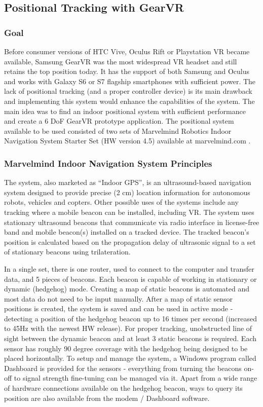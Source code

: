 \documentclass[12pt, a4paper]{article}
\begin{document}
\subsection{Positional Tracking with GearVR}
\subsubsection{Goal}
Before consumer versions of HTC Vive, Oculus Rift or Playstation VR became available, Samsung GearVR was the most widespread VR headset and still retains the top position today. It has the support of both Samsung and Oculus and works with Galaxy S6 or S7 flagship smartphones with sufficient power. The lack of positional tracking (and a proper controller device) is its main drawback and implementing this system would enhance the capabilities of the system. The main idea was to find an indoor positional system with sufficient performance and create a 6 DoF GearVR prototype application. The positional system available to be used consisted of two sets of Marvelmind Robotics Indoor Navigation System Starter Set (HW version 4.5) available at marvelmind.com .

\subsubsection{Marvelmind Indoor Navigation System Principles}
The system, also marketed as “Indoor GPS”, is an ultrasound-based navigation system designed to provide precise (2 cm) location information for autonomous robots, vehicles and copters. Other possible uses of the systems include any tracking where a mobile beacon can be installed, including VR. The system uses stationary ultrasound beacons that communicate via radio interface in license-free band and mobile beacon(s) installed on a tracked device. The tracked beacon’s position is calculated based on the propagation delay of ultrasonic signal to a set of stationary beacons using trilateration.


In a single set, there is one router, used to connect to the computer and transfer data, and 5 pieces of beacons. Each beacon is capable of working in stationary or dynamic (hedgehog) mode. Creating a map of static beacons is automated and most data do not need to be input manually. After a map of static sensor positions is created, the system is saved and can be used in active mode - detecting a position of the hedgehog beacon up to 16 times per second (increased to 45Hz with the newest HW release). For proper tracking, unobstructed line of sight between the dynamic beacon and at least 3 static beacons is required. Each sensor has roughly 90 degree coverage with the hedgehog being designed to be placed horizontally. To setup and manage the system, a Windows program called Dashboard is provided for the sensors - everything from turning the beacons on-off to signal strength fine-tuning can be managed via it. Apart from a wide range of hardware connections available on the hedgehog beacon, ways to query its position are also available from the modem / Dashboard software.
\end{document}
